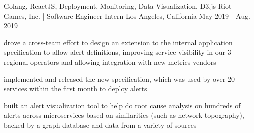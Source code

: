 

\begin{cventries}

\iffalse
  \cventry
    {NodeJS, MongoDB} %
    {Sumus Properties Group Ltd. | Software Developer (Remote, Part-Time)} %
    {Vancouver, British Columbia} %
    {Oct. 2019 - Present} %
    {
      \begin{cvitems} %
        \item {building data management tooling between databases and API platforms}
      \end{cvitems}
    }
\fi
  \cventry
    {Golang, ReactJS, Deployment, Monitoring, Data Visualization, D3.js} %
    {Riot Games, Inc. | Software Engineer Intern} %
    {Los Angeles, California} %
    {May 2019 - Aug. 2019} %
    {
      \begin{cvitems} %
        \item {drove a cross-team effort to design an extension to the internal application specification to allow alert definitions, improving service visibility in our 3 regional operators and allowing integration with new metrics vendors}
        \item{implemented and released the new specification, which was used by over 20 services within the first month to deploy alerts}
        \item {built an alert visualization tool to help do root cause analysis on hundreds of alerts across microservices based on similarities (such as network topography), backed by a graph database and data from a variety of sources}
      \end{cvitems}
    }


\end{cventries}

